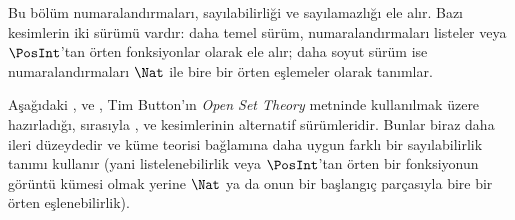 \documentclass[../../../include/open-logic-chapter]{subfiles}
\begin{document}

\begin{editorial}
Bu bölüm numaralandırmaları, sayılabilirliği ve sayılamazlığı ele alır.
Bazı kesimlerin iki sürümü vardır: daha temel sürüm, numaralandırmaları
listeler veya $\PosInt$'tan örten fonksiyonlar olarak ele alır; daha soyut
sürüm ise numaralandırmaları $\Nat$ ile bire bir örten eşlemeler olarak
tanımlar.
\end{editorial}











\begin{editorial}
Aşağıdaki ,
 ve , Tim
Button'ın \emph{Open Set Theory} metninde kullanılmak üzere hazırladığı,
sırasıyla ,  ve
 kesimlerinin alternatif sürümleridir. Bunlar biraz
daha ileri düzeydedir ve küme teorisi bağlamına daha uygun farklı bir
sayılabilirlik tanımı kullanır (yani listelenebilirlik veya $\PosInt$'tan örten
bir fonksiyonun görüntü kümesi olmak yerine $\Nat$ ya da onun bir başlangıç
parçasıyla bire bir örten eşlenebilirlik).
\end{editorial}


\OLEndChapterHook
\end{document}

